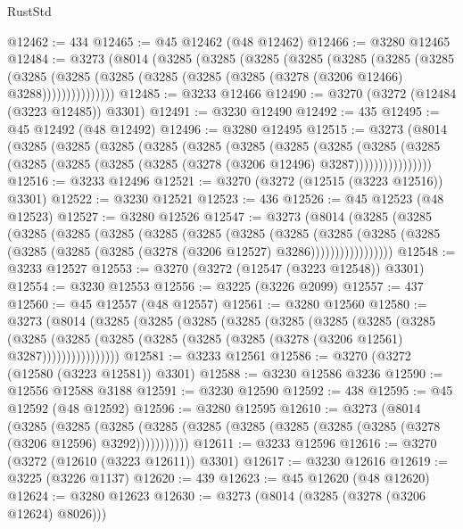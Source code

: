 \begin{lexlean}{RustStd}
\begin{coremodule}
@12462 := 434
@12465 := @45 @12462 (@48 @12462)
@12466 := @3280 @12465
@12484 := @3273
    (@8014
      (@3285
        (@3285
          (@3285
            (@3285
              (@3285
                (@3285
                  (@3285
                    (@3285
                      (@3285 (@3285 (@3285 (@3285 (@3285 (@3278 (@3206 @12466) @3288)))))))))))))))
@12485 := @3233 @12466
@12490 := @3270 (@3272 (@12484 (@3223 @12485)) @3301)
@12491 := @3230 @12490
@12492 := 435
@12495 := @45 @12492 (@48 @12492)
@12496 := @3280 @12495
@12515 := @3273
    (@8014
      (@3285
        (@3285
          (@3285
            (@3285
              (@3285
                (@3285
                  (@3285
                    (@3285
                      (@3285
                        (@3285
                          (@3285 (@3285 (@3285 (@3285 (@3278 (@3206 @12496) @3287))))))))))))))))
@12516 := @3233 @12496
@12521 := @3270 (@3272 (@12515 (@3223 @12516)) @3301)
@12522 := @3230 @12521
@12523 := 436
@12526 := @45 @12523 (@48 @12523)
@12527 := @3280 @12526
@12547 := @3273
    (@8014
      (@3285
        (@3285
          (@3285
            (@3285
              (@3285
                (@3285
                  (@3285
                    (@3285
                      (@3285
                        (@3285
                          (@3285
                            (@3285 (@3285 (@3285 (@3285 (@3278 (@3206 @12527) @3286)))))))))))))))))
@12548 := @3233 @12527
@12553 := @3270 (@3272 (@12547 (@3223 @12548)) @3301)
@12554 := @3230 @12553
@12556 := @3225 (@3226 @2099)
@12557 := 437
@12560 := @45 @12557 (@48 @12557)
@12561 := @3280 @12560
@12580 := @3273
    (@8014
      (@3285
        (@3285
          (@3285
            (@3285
              (@3285
                (@3285
                  (@3285
                    (@3285
                      (@3285
                        (@3285
                          (@3285 (@3285 (@3285 (@3285 (@3278 (@3206 @12561) @3287))))))))))))))))
@12581 := @3233 @12561
@12586 := @3270 (@3272 (@12580 (@3223 @12581)) @3301)
@12588 := @3230 @12586 @3236
@12590 := @12556 @12588 @3188
@12591 := @3230 @12590
@12592 := 438
@12595 := @45 @12592 (@48 @12592)
@12596 := @3280 @12595
@12610 := @3273
    (@8014
      (@3285
        (@3285
          (@3285 (@3285 (@3285 (@3285 (@3285 (@3285 (@3285 (@3278 (@3206 @12596) @3292)))))))))))
@12611 := @3233 @12596
@12616 := @3270 (@3272 (@12610 (@3223 @12611)) @3301)
@12617 := @3230 @12616
@12619 := @3225 (@3226 @1137)
@12620 := 439
@12623 := @45 @12620 (@48 @12620)
@12624 := @3280 @12623
@12630 := @3273 (@8014 (@3285 (@3278 (@3206 @12624) @8026)))

\end{coremodule}
\end{lexlean}

